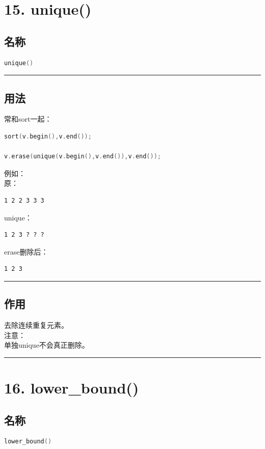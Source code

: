 \documentclass[10pt,twocolumn]{extarticle}
\begin{document}
\section{15. unique()}

\subsection{名称}
\begin{lstlisting}[language=C++]
unique()
\end{lstlisting}

\noindent\rule{\linewidth}{0.4pt}

\subsection{用法}
常和sort一起：
\begin{lstlisting}[language=C++]
sort(v.begin(),v.end());

v.erase(unique(v.begin(),v.end()),v.end());
\end{lstlisting}
例如：\\
原：
\begin{lstlisting}
1 2 2 3 3 3
\end{lstlisting}
unique：
\begin{lstlisting}
1 2 3 ? ? ?
\end{lstlisting}
erase删除后：
\begin{lstlisting}
1 2 3
\end{lstlisting}

\noindent\rule{\linewidth}{0.4pt}

\subsection{作用}
去除连续重复元素。\\
注意：\\
单独unique不会真正删除。

\noindent\rule{\linewidth}{0.4pt}

\section{16. lower\_bound()}

\subsection{名称}
\begin{lstlisting}[language=C++]
lower_bound()
\end{lstlisting}
\end{document}

